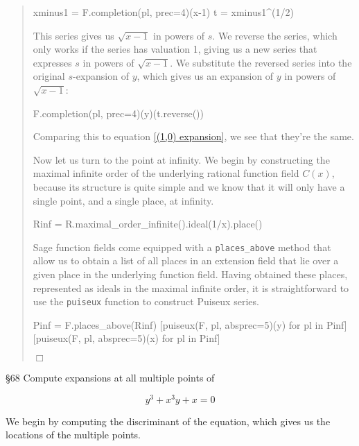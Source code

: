 \begin{examplecont}
\begin{quote}
\begin{sageblock}[ch7]
xminus1 = F.completion(pl, prec=4)(x-1)
t = xminus1^(1/2)
\end{sageblock}

This series gives us $\sqrt{x-1}$ in powers of $s$.
We reverse the series, which only works if the series has valuation 1,
giving us a new series that expresses $s$ in powers of $\sqrt{x-1}$.
We substitute the reversed series into the original $s$-expansion of $y$,
which gives us an expansion of $y$ in powers of $\sqrt{x-1}$:

\begin{sageblock}[ch7]
F.completion(pl, prec=4)(y)(t.reverse())
\end{sageblock}

Comparing this to equation \ref{(1,0) expansion}, we see that they're the same.

Now let us turn to the point at infinity.  We begin by constructing the
maximal infinite order of the underlying rational function field $C(x)$,
because its structure is quite simple and we know that it will only have a single point,
and a single place, at infinity.

\begin{sageblock}[ch7]
Rinf = R.maximal_order_infinite().ideal(1/x).place()
\end{sageblock}

Sage function fields come equipped with a {\tt places\_above} method that
allow us to obtain a list of all places in an extension field that lie
over a given place in the underlying function field.  Having obtained
these places, represented as ideals in the maximal infinite order,
it is straightforward to use the {\tt puiseux} function
to construct Puiseux series.

\begin{sageblock}[ch7]
Pinf = F.places_above(Rinf)
[puiseux(F, pl, absprec=5)(y) for pl in Pinf]
[puiseux(F, pl, absprec=5)(x) for pl in Pinf]
\end{sageblock}

\hfill$\Box$\end{quote}
\end{examplecont}


\example \cite{bliss} \S 68
Compute expansions at all multiple points of

$$y^3+x^3y+x=0$$

We begin by computing the discriminant of the
equation, which gives us the locations of the multiple points.

